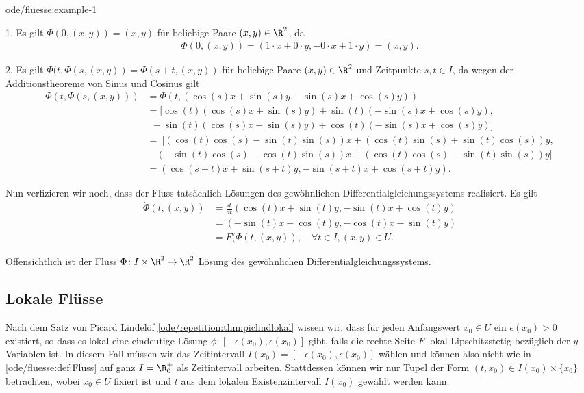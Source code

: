 \documentclass[letterpaper,10pt,english]{jupyterBook}
\begin{document}
\begin{example}{}{ode/fluesse:example-1}
\par
1. Es gilt \(\Phi(0, (x,y)) = (x,y)\) für beliebige Paare \((x,y) \in \R^2\), da
\begin{align*}
\Phi(0, (x,y)) = (1\cdot x + 0\cdot y, - 0 \cdot x + 1 \cdot y) = (x,y).
\end{align*}
\par
2. Es gilt \(\Phi(t, \Phi(s,(x,y)) = \Phi(s + t, (x,y))\) für beliebige Paare \((x,y) \in \R^2\) und Zeitpunkte \(s,t \in I\), da wegen der Additionstheoreme von Sinus und Cosinus gilt
\begin{align*}
\Phi(t, \Phi(s,(x,y))) &= \Phi(t, (\cos(s)x + \sin(s)y, -\sin(s)x + \cos(s)y)) \\
&= [\cos(t)(\cos(s)x + \sin(s)y) + \sin(t)(-\sin(s)x + \cos(s)y), \\
& \ \ -\sin(t)(\cos(s)x + \sin(s)y) + \cos(t)(-\sin(s)x + \cos(s)y)]\\
&= \ [ (\cos(t)\cos(s) - \sin(t)\sin(s))x + (\cos(t)\sin(s) + \sin(t)\cos(s))y, \\
& \quad (-\sin(t)\cos(s) - \cos(t)\sin(s))x + (\cos(t)\cos(s) - \sin(t)\sin(s))y ] \\
&= (\cos(s+t)x + \sin(s+t)y, -\sin(s+t)x + \cos(s+t)y).
\end{align*}
\par
Nun verfizieren wir noch, dass der Fluss tatsächlich Lösungen des gewöhnlichen Differentialgleichungssystems realisiert.
Es gilt
\begin{align*}
\dot{\Phi}(t, (x,y)) &= \frac{d}{dt}(\cos(t)x + \sin(t)y, -\sin(t)x + \cos(t)y) 
\\&=
(-\sin(t)x + \cos(t)y, -\cos(t)x - \sin(t)y) 
\\&= 
F(\Phi(t,(x,y)), \quad \forall t \in I, (x,y) \in U.
\end{align*}
\par
Offensichtlich ist der Fluss \(\Phi \colon I \times \R^2 \rightarrow \R^2\) Lösung des gewöhnlichen Differentialgleichungssystems.
\end{example}


\subsection{Lokale Flüsse}
\label{\detokenize{ode/fluesse:lokale-flusse}}
\par
Nach dem Satz von Picard Lindelöf \cref{ode/repetition:thm:piclindlokal} wissen wir, dass für jeden Anfangswert \(x_0\in U\) ein \(\epsilon(x_0)>0\) existiert, so dass es lokal eine eindeutige Lösung \(\phi: [-\epsilon(x_0), \epsilon(x_0)]\) gibt, falls die rechte Seite \(F\) lokal Lipschitzstetig bezüglich der \(y\) Variablen ist.
In diesem Fall müssen wir das Zeitintervall \(I(x_0)=[-\epsilon(x_0), \epsilon(x_0)]\) wählen und können also nicht wie in \cref{ode/fluesse:def:Fluss} auf ganz \(I = \R^+_0\) als Zeitintervall arbeiten.
Stattdessen können wir nur Tupel der Form \((t, x_0) \in I(x_0) \times \{x_0\}\) betrachten, wobei \(x_0\in U\) fixiert ist und \(t\) aus dem lokalen Existenzintervall \(I(x_0)\) gewählt werden kann.
\end{document}
